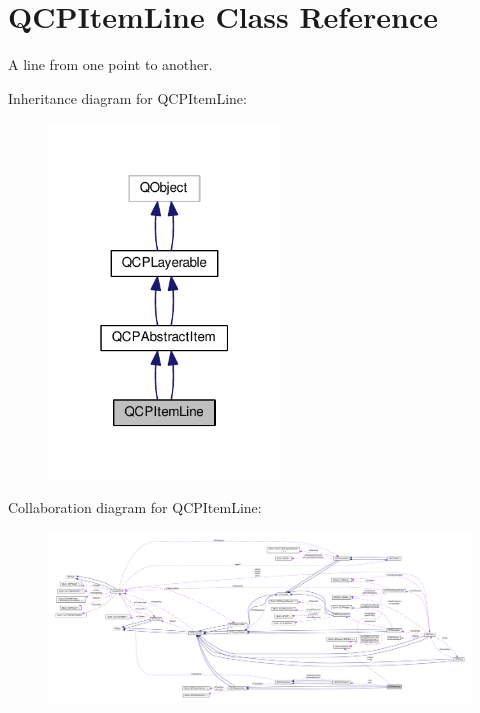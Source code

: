 \hypertarget{class_q_c_p_item_line}{}\section{Q\+C\+P\+Item\+Line Class Reference}
\label{class_q_c_p_item_line}


A line from one point to another.  




Inheritance diagram for Q\+C\+P\+Item\+Line\+:\nopagebreak
\begin{figure}[H]
\begin{center}
\leavevmode
\includegraphics[width=175pt]{class_q_c_p_item_line__inherit__graph}
\end{center}
\end{figure}


Collaboration diagram for Q\+C\+P\+Item\+Line\+:\nopagebreak
\begin{figure}[H]
\begin{center}
\leavevmode
\includegraphics[width=350pt]{class_q_c_p_item_line__coll__graph}
\end{center}
\end{figure}
